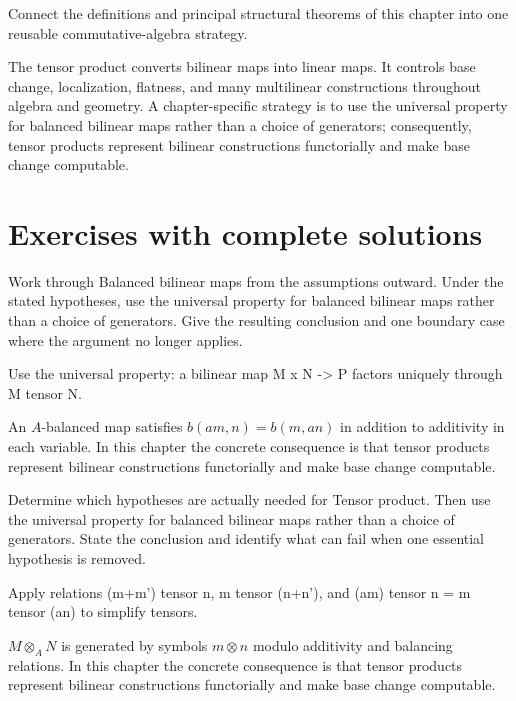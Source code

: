 \begin{problem}\label{prob:v10-problem-12}
Connect the definitions and principal structural theorems of this chapter into one reusable commutative-algebra strategy.
\end{problem}
\begin{solution}
The tensor product converts bilinear maps into linear maps. It controls base change, localization, flatness, and many multilinear constructions throughout algebra and geometry. A chapter-specific strategy is to use the universal property for balanced bilinear maps rather than a choice of generators; consequently, tensor products represent bilinear constructions functorially and make base change computable.
\end{solution}

\section{Exercises with complete solutions}

\begin{exercise}\label{exr:v10-01}
Work through Balanced bilinear maps from the assumptions outward. Under the stated hypotheses, use the universal property for balanced bilinear maps rather than a choice of generators. Give the resulting conclusion and one boundary case where the argument no longer applies.
\end{exercise}
\begin{hint}
Use the universal property: a bilinear map M x N -> P factors uniquely through M tensor N.
\end{hint}
\begin{solution}
An $A$-balanced map satisfies $b(am,n)=b(m,an)$ in addition to additivity in each variable. In this chapter the concrete consequence is that tensor products represent bilinear constructions functorially and make base change computable.
\end{solution}

\begin{exercise}\label{exr:v10-02}
Determine which hypotheses are actually needed for Tensor product. Then use the universal property for balanced bilinear maps rather than a choice of generators. State the conclusion and identify what can fail when one essential hypothesis is removed.
\end{exercise}
\begin{hint}
Apply relations (m+m') tensor n, m tensor (n+n'), and (am) tensor n = m tensor (an) to simplify tensors.
\end{hint}
\begin{solution}
$M\otimes_A N$ is generated by symbols $m\otimes n$ modulo additivity and balancing relations. In this chapter the concrete consequence is that tensor products represent bilinear constructions functorially and make base change computable.
\end{solution}

